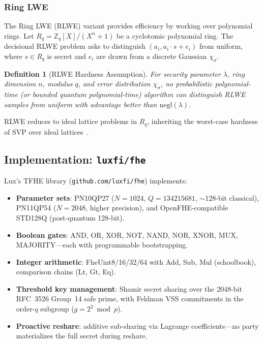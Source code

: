 \documentclass[11pt,a4paper]{article}
\newtheorem{definition}{Definition}[section]
\begin{document}
\subsubsection{Ring LWE}

The Ring LWE (RLWE) variant provides efficiency by working over
polynomial rings. Let $R_q = \mathbb{Z}_q[X]/(X^n + 1)$ be a
cyclotomic polynomial ring. The decisional RLWE problem asks to
distinguish $(a_i, a_i \cdot s + e_i)$ from uniform, where
$s \in R_q$ is secret and $e_i$ are drawn from a discrete Gaussian
$\chi_\sigma$.

\begin{definition}[RLWE Hardness Assumption]
For security parameter $\lambda$, ring dimension $n$, modulus $q$,
and error distribution $\chi_\sigma$, no probabilistic
polynomial-time (or bounded quantum polynomial-time) algorithm can
distinguish RLWE samples from uniform with advantage better than
$\mathrm{negl}(\lambda)$.
\end{definition}

RLWE reduces to ideal lattice problems in $R_q$, inheriting the
worst-case hardness of SVP over ideal lattices~\cite{lyubashevsky2013}.

\subsection{Implementation: \texttt{luxfi/fhe}}

Lux's TFHE library (\texttt{github.com/luxfi/fhe}) implements:

\begin{itemize}[nosep]
  \item \textbf{Parameter sets}: PN10QP27 ($N{=}1024$, $Q{=}134215681$,
        $\sim$128-bit classical), PN11QP54 ($N{=}2048$, higher precision),
        and OpenFHE-compatible STD128Q (post-quantum 128-bit).
  \item \textbf{Boolean gates}: AND, OR, XOR, NOT, NAND, NOR, XNOR,
        MUX, MAJORITY---each with programmable bootstrapping.
  \item \textbf{Integer arithmetic}: FheUint8/16/32/64 with
        Add, Sub, Mul (schoolbook), comparison chains (Lt, Gt, Eq).
  \item \textbf{Threshold key management}: Shamir secret sharing over
        the 2048-bit RFC~3526 Group~14 safe prime, with Feldman VSS
        commitments in the order-$q$ subgroup ($g = 2^2 \bmod p$).
  \item \textbf{Proactive reshare}: additive sub-sharing via Lagrange
        coefficients---no party materializes the full secret during
        reshare.
\end{itemize}
\end{document}
